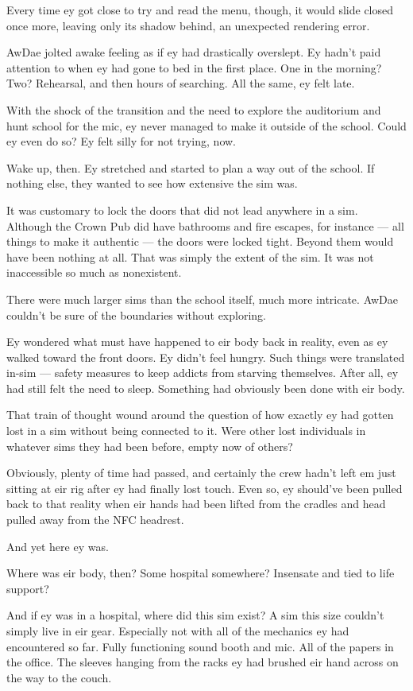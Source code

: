 Every time ey got close to try and read the menu, though, it would slide closed once more, leaving only its shadow behind, an unexpected rendering error.

AwDae jolted awake feeling as if ey had drastically overslept. Ey hadn't paid attention to when ey had gone to bed in the first place. One in the morning? Two? Rehearsal, and then hours of searching. All the same, ey felt late.

With the shock of the transition and the need to explore the auditorium and hunt school for the mic, ey never managed to make it outside of the school. Could ey even do so? Ey felt silly for not trying, now.

Wake up, then. Ey stretched and started to plan a way out of the school. If nothing else, they wanted to see how extensive the sim was.

It was customary to lock the doors that did not lead anywhere in a sim. Although the Crown Pub did have bathrooms and fire escapes, for instance --- all things to make it authentic --- the doors were locked tight. Beyond them would have been nothing at all. That was simply the extent of the sim. It was not inaccessible so much as nonexistent.

There were much larger sims than the school itself, much more intricate. AwDae couldn't be sure of the boundaries without exploring.

Ey wondered what must have happened to eir body back in reality, even as ey walked toward the front doors. Ey didn't feel hungry. Such things were translated in-sim --- safety measures to keep addicts from starving themselves. After all, ey had still felt the need to sleep. Something had obviously been done with eir body.

That train of thought wound around the question of how exactly ey had gotten lost in a sim without being connected to it. Were other lost individuals in whatever sims they had been before, empty now of others?

Obviously, plenty of time had passed, and certainly the crew hadn't left em just sitting at eir rig after ey had finally lost touch. Even so, ey should've been pulled back to that reality when eir hands had been lifted from the cradles and head pulled away from the NFC headrest.

And yet here ey was.

Where was eir body, then? Some hospital somewhere? Insensate and tied to life support?

And if ey was in a hospital, where did this sim exist? A sim this size couldn't simply live in eir gear. Especially not with all of the mechanics ey had encountered so far. Fully functioning sound booth and mic. All of the papers in the office. The sleeves hanging from the racks ey had brushed eir hand across on the way to the couch.

